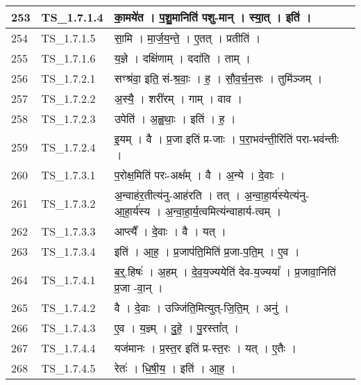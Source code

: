 \documentclass[17pt]{extarticle}
\begin{document}
\begin{longtable}{||p{0.4in}||p{0.9in}||p{4.0in}||p{0.9in}||}
        \hline
            253 & TS\_1.7.1.4 & का॒मये॑त   ।   प॒शु॒मानिति॑ पशु{-}मान्   ।   स्या॒त्   ।   इति॑   ।    &      \\
        \hline
            254 & TS\_1.7.1.5 & सा॒मि   ।   मा॒र्ज॒य॒न्ते॒   ।   ए॒तत्   ।   प्रतीति॑   ।    &      \\
        \hline
            255 & TS\_1.7.1.6 & य॒ज्ञे   ।   दक्षि॑णाम्   ।   ददा॑ति   ।   ताम्   ।    &      \\
        \hline
            256 & TS\_1.7.2.1 & सꣳश्र॑वा॒ इति॒ सं{-}श्र॒वाः॒   ।   ह॒   ।   सौ॒व॒र्च॒न॒सः   ।   तुमि॑ञ्जम्   ।    &      \\
        \hline
            257 & TS\_1.7.2.2 & अ॒स्यै॒   ।   शरी॑रम्   ।   गाम्   ।   वाव   ।    &      \\
        \hline
            258 & TS\_1.7.2.3 & उपेति॑   ।   अ॒ह्व॒थाः॒   ।   इति॑   ।   ह॒   ।    &      \\
        \hline
            259 & TS\_1.7.2.4 & इ॒यम्   ।   वै   ।   प्र॒जा इति॑ प्र{-}जाः   ।   प॒रा॒भव॑न्ती॒रिति॑ परा{-}भव॑न्तीः   ।    &      \\
        \hline
            260 & TS\_1.7.3.1 & प॒रोक्ष॒मिति॑ परः{-}अक्ष᳚म्   ।   वै   ।   अ॒न्ये   ।   दे॒वाः   ।    &      \\
        \hline
            261 & TS\_1.7.3.2 & अ॒न्वाह॑र॒तीत्य॑नु{-}आह॑रति   ।   तत्   ।   अ॒न्वा॒हा॒र्य॑स्येत्य॑नु{-}आ॒हा॒र्य॑स्य   ।   अ॒न्वा॒हा॒र्य॒त्वमित्य॑न्वाहार्य{-}त्वम्   ।    &      \\
        \hline
            262 & TS\_1.7.3.3 & आप्त्यै᳚   ।   दे॒वाः   ।   वै   ।   यत्   ।    &      \\
        \hline
            263 & TS\_1.7.3.4 & इति॑   ।   आ॒ह॒   ।   प्र॒जाप॑ति॒मिति॑ प्र॒जा{-}प॒ति॒म्   ।   ए॒व   ।    &      \\
        \hline
            264 & TS\_1.7.4.1 & ब॒र्॒.हिषः॑   ।   अ॒हम्   ।   दे॒व॒य॒ज्ययेति॑ देव{-}य॒ज्यया᳚   ।   प्र॒जावा॒निति॑ प्र॒जा {-}वा॒न्   ।    &      \\
        \hline
            265 & TS\_1.7.4.2 & वै   ।   दे॒वाः   ।   उज्जि॑ति॒मित्युत्{-}जि॒ति॒म्   ।   अनु॑   ।    &      \\
        \hline
            266 & TS\_1.7.4.3 & ए॒व   ।   य॒ज्ञ्म्   ।   दु॒हे॒   ।   पु॒रस्ता᳚त्   ।    &      \\
        \hline
            267 & TS\_1.7.4.4 & यज॑मानः   ।   प्र॒स्त॒र इति॑ प्र{-}स्त॒रः   ।   यत्   ।   ए॒तैः   ।    &      \\
        \hline
            268 & TS\_1.7.4.5 & रेतः॑   ।   धि॒षी॒य॒   ।   इति॑   ।   आ॒ह॒   ।    &      \\

\end{longtable}
\end{document}
